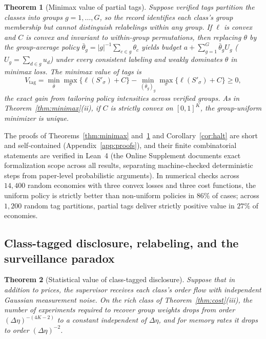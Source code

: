 \documentclass[11pt,letterpaper]{article}
\newtheorem{theorem}{Theorem}[section]
\theoremstyle{definition}
\begin{document}
\begin{theorem}[Minimax value of partial tags]\label{thm:partial-minimax}
Suppose verified tags partition the classes into groups $g = 1, \dots, G$, so the record identifies each class's group membership but cannot distinguish relabelings within any group. If $\ell$ is convex and $C$ is convex and invariant to within-group permutations, then replacing $\theta$ by the group-average policy $\bar{\theta}_g = |g|^{-1} \sum_{c \in g} \theta_c$ yields budget $a + \sum_{g=1}^G \bar{\theta}_g U_g$ ($U_g = \sum_{d \in g} u_d$) under every consistent labeling and weakly dominates $\theta$ in minimax loss. The minimax value of tags is
\[
  V_{\mathrm{tag}} = \min_{\bar{\theta}} \max_{\sigma} \{\ell(S'_\sigma) + C\} - \min_{(\bar{\theta}_g)_g} \max_{\sigma} \{\ell(S'_\sigma) + C\} \ge 0,
\]
the exact gain from tailoring policy intensities across verified groups. As in Theorem~\ref{thm:minimax}(ii), if $C$ is strictly convex on $[0, 1]^K$, the group-uniform minimizer is unique.
\end{theorem}

The proofs of Theorems~\ref{thm:minimax} and~\ref{thm:partial-minimax} and Corollary~\ref{cor:halt} are short and self-contained (Appendix~\ref{app:proofs}), and their finite combinatorial statements are verified in Lean~4 (the Online Supplement documents exact formalization scope across all results, separating machine-checked deterministic steps from paper-level probabilistic arguments). In numerical checks across $14{,}400$ random economies with three convex losses and three cost functions, the uniform policy is strictly better than non-uniform policies in $86\%$ of cases; across $1{,}200$ random tag partitions, partial tags deliver strictly positive value in $27\%$ of economies.

\subsection{Class-tagged disclosure, relabeling, and the surveillance paradox}

\begin{theorem}[Statistical value of class-tagged disclosure]\label{thm:tags}
Suppose that in addition to prices, the supervisor receives each class's order flow with independent Gaussian measurement noise. On the rich class of Theorem~\ref{thm:cost}(iii), the number of experiments required to recover group weights drops from order $(\Delta\eta)^{-(4K-2)}$ to a constant independent of $\Delta\eta$, and for memory rates it drops to order $(\Delta\eta)^{-2}$.
\end{theorem}
\end{document}
